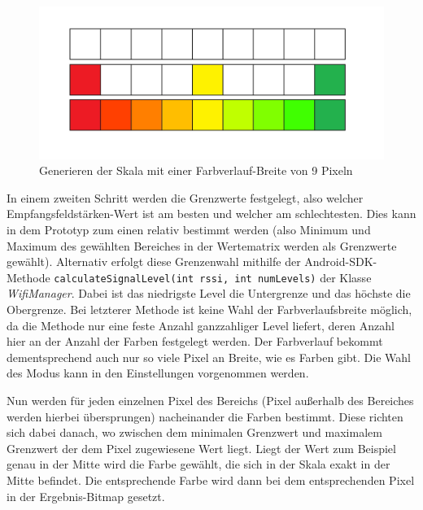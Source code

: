 \documentclass[10pt]{scrartcl}
\newcommand{\inlcode}{\texttt}
\begin{document}
\begin{figure}
\centering
\includegraphics[scale=0.4]{images/skala.jpg}
\caption{\label{img:skala}Generieren der Skala mit einer Farbverlauf-Breite von 9 Pixeln}
\end{figure}

In einem zweiten Schritt werden die Grenzwerte festgelegt, also welcher Empfangsfeldstärken-Wert ist am besten und welcher am schlechtesten. Dies kann in dem Prototyp zum einen relativ bestimmt werden (also Minimum und Maximum des gewählten Bereiches in der Wertematrix werden als Grenzwerte gewählt). Alternativ erfolgt diese Grenzenwahl mithilfe der Android-SDK-Methode \inlcode{calculateSignalLevel(int rssi, int numLevels)} der Klasse \textit{WifiManager}. Dabei ist das niedrigste Level die Untergrenze und das höchste die Obergrenze. Bei letzterer Methode ist keine Wahl der Farbverlaufsbreite möglich, da die Methode nur eine feste Anzahl ganzzahliger Level liefert, deren Anzahl hier an der Anzahl der Farben festgelegt werden. Der Farbverlauf bekommt dementsprechend auch nur so viele Pixel an Breite, wie es Farben gibt. Die Wahl des Modus kann in den Einstellungen vorgenommen werden.

Nun werden für jeden einzelnen Pixel des Bereichs (Pixel außerhalb des Bereiches werden hierbei übersprungen) nacheinander die Farben bestimmt. Diese richten sich dabei danach, wo zwischen dem minimalen Grenzwert und maximalem Grenzwert der dem Pixel zugewiesene Wert liegt. Liegt der Wert zum Beispiel genau in der Mitte wird die Farbe gewählt, die sich in der Skala exakt in der Mitte befindet. Die entsprechende Farbe wird dann bei dem entsprechenden Pixel in der Ergebnis-Bitmap gesetzt.
\end{document}
